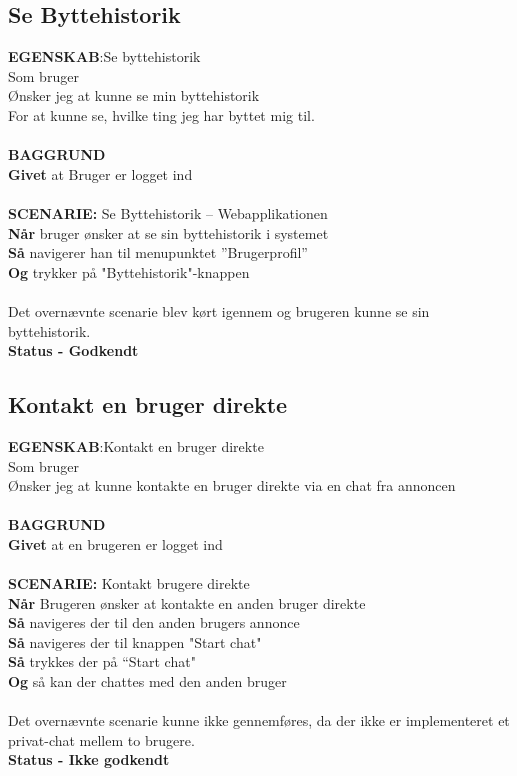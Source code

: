 \subsection{Se Byttehistorik}
{\color{blue}\textbf{EGENSKAB}:}Se byttehistorik \\
Som bruger \\
Ønsker jeg at kunne se min byttehistorik \\
For at kunne se, hvilke ting jeg har byttet mig til.\\ \\
{\color{blue}\textbf{BAGGRUND}} \\
{\color{blue}\textbf{Givet}} at Bruger er logget ind \\
\\
{\color{blue}\textbf{SCENARIE:}} Se Byttehistorik – Webapplikationen \\
{\color{blue}\textbf{Når}} bruger ønsker at se sin byttehistorik i systemet\\
{\color{blue}\textbf{Så}} navigerer han til menupunktet ”Brugerprofil” \\
{\color{blue}\textbf{Og}} trykker på "Byttehistorik"-knappen \\ \\
Det overnævnte scenarie blev kørt igennem og brugeren kunne se sin byttehistorik. \\
\textbf{Status - Godkendt}

\subsection{Kontakt en bruger direkte}
{\color{blue}\textbf{EGENSKAB}:}Kontakt en bruger direkte \\
Som bruger \\
Ønsker jeg at kunne kontakte en bruger direkte via en chat fra annoncen \\ \\
{\color{blue}\textbf{BAGGRUND}} \\
{\color{blue}\textbf{Givet}} at en brugeren er logget ind
\\ \\
{\color{blue}\textbf{SCENARIE:}} Kontakt brugere direkte\\
{\color{blue}\textbf{Når}} Brugeren ønsker at kontakte en anden bruger direkte \\
{\color{blue}\textbf{Så}} navigeres der til den anden brugers annonce  \\
{\color{blue}\textbf{Så}} navigeres der til knappen "Start chat" \\
{\color{blue}\textbf{Så}} trykkes der på “Start chat" \\
{\color{blue}\textbf{Og}} så kan der chattes med den anden bruger \\ 
\\
Det overnævnte scenarie kunne ikke gennemføres, da der ikke er implementeret et privat-chat mellem to brugere. \\
\textbf{Status - Ikke godkendt}


